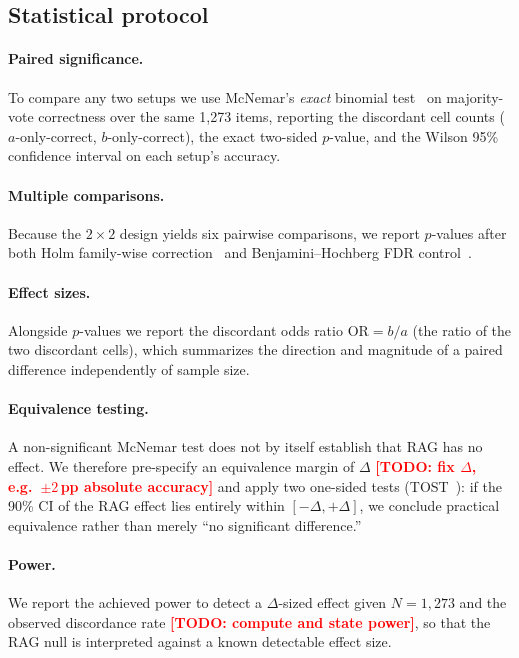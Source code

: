 \documentclass[11pt,a4paper]{article}
\newcommand{\TODO}[1]{\textcolor{red}{\textbf{[TODO: #1]}}}
\begin{document}
\subsection{Statistical protocol}
\label{sec:stats}

\paragraph{Paired significance.} To compare any two setups we use McNemar's
\emph{exact} binomial test~\cite{dietterich1998mcnemar} on majority-vote
correctness over the same 1{,}273 items, reporting the discordant cell counts
($a$-only-correct, $b$-only-correct), the exact two-sided $p$-value, and the
Wilson 95\% confidence interval on each setup's accuracy.

\paragraph{Multiple comparisons.} Because the $2\!\times\!2$ design yields six
pairwise comparisons, we report $p$-values after both Holm family-wise
correction~\cite{holm1979} and Benjamini--Hochberg FDR
control~\cite{benjamini1995fdr}.

\paragraph{Effect sizes.} Alongside $p$-values we report the discordant odds
ratio $\mathrm{OR}=b/a$ (the ratio of the two discordant cells), which summarizes
the direction and magnitude of a paired difference independently of sample size.

\paragraph{Equivalence testing.} A non-significant McNemar test does not by
itself establish that RAG has no effect. We therefore pre-specify an equivalence
margin of $\Delta$ \TODO{fix $\Delta$, e.g.\ $\pm 2$\,pp absolute accuracy} and
apply two one-sided tests (TOST~\cite{lakens2017tost}): if the 90\% CI of the RAG
effect lies entirely within $[-\Delta,+\Delta]$, we conclude practical
equivalence rather than merely ``no significant difference.''

\paragraph{Power.} We report the achieved power to detect a $\Delta$-sized effect
given $N{=}1{,}273$ and the observed discordance rate \TODO{compute and state
power}, so that the RAG null is interpreted against a known detectable effect
size.
\end{document}
